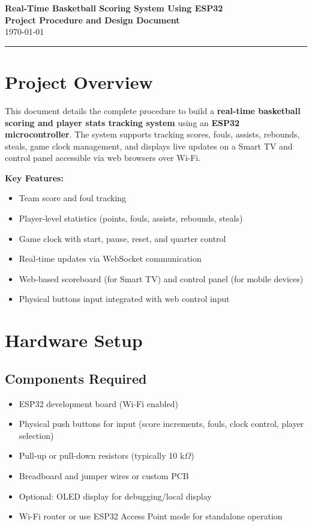 \documentclass[a4paper,12pt]{article}
\begin{document}
\begin{center}
    {\LARGE \textbf{Real-Time Basketball Scoring System Using ESP32}}\\[0.5em]
    \textbf{Project Procedure and Design Document}\\[1em]
    \today
\end{center}

\hrule
\vspace{1em}

\section{Project Overview}

This document details the complete procedure to build a \textbf{real-time basketball scoring and player stats tracking system} using an \textbf{ESP32 microcontroller}. The system supports tracking scores, fouls, assists, rebounds, steals, game clock management, and displays live updates on a Smart TV and control panel accessible via web browsers over Wi-Fi.

\vspace{1em}
\noindent \textbf{Key Features:}
\begin{itemize}[noitemsep]
    \item Team score and foul tracking
    \item Player-level statistics (points, fouls, assists, rebounds, steals)
    \item Game clock with start, pause, reset, and quarter control
    \item Real-time updates via WebSocket communication
    \item Web-based scoreboard (for Smart TV) and control panel (for mobile devices)
    \item Physical buttons input integrated with web control input
\end{itemize}

\section{Hardware Setup}

\subsection{Components Required}
\begin{itemize}[noitemsep]
    \item ESP32 development board (Wi-Fi enabled)
    \item Physical push buttons for input (score increments, fouls, clock control, player selection)
    \item Pull-up or pull-down resistors (typically 10 k$\Omega$)
    \item Breadboard and jumper wires or custom PCB
    \item Optional: OLED display for debugging/local display
    \item Wi-Fi router or use ESP32 Access Point mode for standalone operation
\end{itemize}
\end{document}

